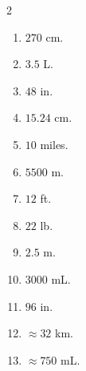 \documentclass[11pt]{article}
\begin{document}
\begin{keybox}
\begin{multicols}{2}
\small
\begin{enumerate}[leftmargin=*,itemsep=3pt]
  \item $270$ cm.
  \item $3.5$ L.
  \item $48$ in.
  \item $15.24$ cm.
  \item $10$ miles.
  \item $5500$ m.
  \item $12$ ft.
  \item $22$ lb.
  \item $2.5$ m.
  \item $3000$ mL.
  \item $96$ in.
  \item $\approx32$ km.
  \item $\approx750$ mL.
\end{enumerate}
\end{multicols}
\end{keybox}
\end{document}
